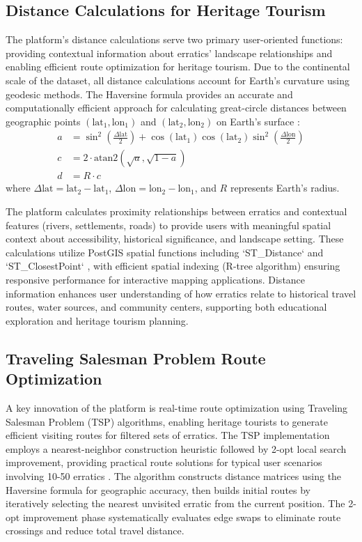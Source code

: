 \subsection{Distance Calculations for Heritage Tourism}
\label{subsec:distance_calculations}

The platform's distance calculations serve two primary user-oriented functions: providing contextual information about erratics' landscape relationships and enabling efficient route optimization for heritage tourism. Due to the continental scale of the dataset, all distance calculations account for Earth's curvature using geodesic methods. The Haversine formula provides an accurate and computationally efficient approach for calculating great-circle distances between geographic points $(\text{lat}_1, \text{lon}_1)$ and $(\text{lat}_2, \text{lon}_2)$ on Earth's surface \cite{Sinnott1984}:
\begin{align*}
    a &= \sin^2\left(\frac{\Delta \text{lat}}{2}\right) + \cos(\text{lat}_1) \cos(\text{lat}_2) \sin^2\left(\frac{\Delta \text{lon}}{2}\right) \\
    c &= 2 \cdot \text{atan2}(\sqrt{a}, \sqrt{1-a}) \\
    d &= R \cdot c
\end{align*}
where $\Delta \text{lat} = \text{lat}_2 - \text{lat}_1$, $\Delta \text{lon} = \text{lon}_2 - \text{lon}_1$, and $R$ represents Earth's radius.

The platform calculates proximity relationships between erratics and contextual features (rivers, settlements, roads) to provide users with meaningful spatial context about accessibility, historical significance, and landscape setting. These calculations utilize PostGIS spatial functions including `ST\_Distance` and `ST\_ClosestPoint` \cite{Goodchild1992}, with efficient spatial indexing (R-tree algorithm) \cite{Guttman1984} ensuring responsive performance for interactive mapping applications. Distance information enhances user understanding of how erratics relate to historical travel routes, water sources, and community centers, supporting both educational exploration and heritage tourism planning.

\subsection{Traveling Salesman Problem Route Optimization}
\label{subsec:tsp_optimization}

A key innovation of the platform is real-time route optimization using Traveling Salesman Problem (TSP) algorithms, enabling heritage tourists to generate efficient visiting routes for filtered sets of erratics. The TSP implementation employs a nearest-neighbor construction heuristic followed by 2-opt local search improvement, providing practical route solutions for typical user scenarios involving 10-50 erratics \cite{Burrough2015}. The algorithm constructs distance matrices using the Haversine formula for geographic accuracy, then builds initial routes by iteratively selecting the nearest unvisited erratic from the current position. The 2-opt improvement phase systematically evaluates edge swaps to eliminate route crossings and reduce total travel distance.

